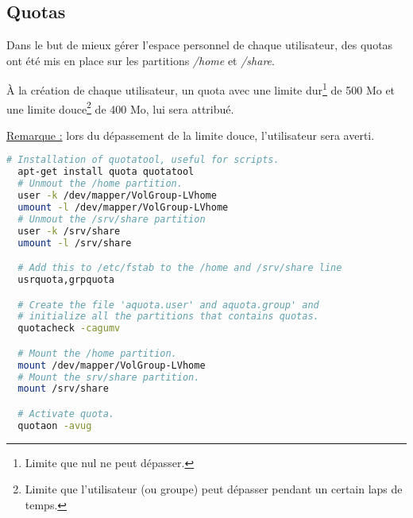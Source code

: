 \subsection{Quotas}
\label{subsec:quotas}

Dans le but de mieux gérer l'espace personnel de chaque utilisateur, des quotas
ont été mis en place sur les partitions \textit{/home} et \textit{/share}.

À la création de chaque utilisateur, un quota avec une limite
dur\footnote{Limite que nul ne peut dépasser.} de 500 Mo et une limite
douce\footnote{Limite que l'utilisateur (ou groupe) peut dépasser pendant un
certain laps de temps.} de 400 Mo, lui sera attribué.

\underline{Remarque :} lors du dépassement de la limite douce, l'utilisateur
sera averti.

\begin{lstlisting}[language=bash]
  # Installation of quotatool, useful for scripts.
  apt-get install quota quotatool
  # Unmout the /home partition.
  user -k /dev/mapper/VolGroup-LVhome
  umount -l /dev/mapper/VolGroup-LVhome
  # Unmout the /srv/share partition
  user -k /srv/share
  umount -l /srv/share

  # Add this to /etc/fstab to the /home and /srv/share line
  usrquota,grpquota

  # Create the file 'aquota.user' and aquota.group' and
  # initialize all the partitions that contains quotas.
  quotacheck -cagumv

  # Mount the /home partition.
  mount /dev/mapper/VolGroup-LVhome
  # Mount the srv/share partition.
  mount /srv/share

  # Activate quota.
  quotaon -avug
\end{lstlisting}

